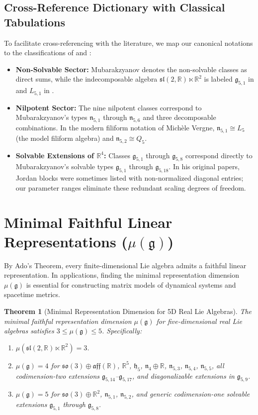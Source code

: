 \documentclass[11pt,a4paper]{article}
\newtheorem{theorem}{Theorem}[section]
\theoremstyle{definition}
\theoremstyle{remark}
\newcommand{\R}{\mathbb{R}}
\newcommand{\g}{\mathfrak{g}}
\newcommand{\hh}{\mathfrak{h}}
\begin{document}
\subsection{Cross-Reference Dictionary with Classical Tabulations}
To facilitate cross-referencing with the literature, we map our canonical notations to the classifications of \citet{Mubarakzyanov1966} and \citet{SnoblWinternitz}:
\begin{itemize}
    \item \textbf{Non-Solvable Sector:} Mubarakzyanov denotes the non-solvable classes as direct sums, while the indecomposable algebra $\mathfrak{sl}(2,\R) \ltimes \R^2$ is labeled $\mathfrak{g}_{5,1}$ in \citet{Turkowski1988} and $L_{5,1}$ in \citet[\S~4.2]{SnoblWinternitz}.
    \item \textbf{Nilpotent Sector:} The nine nilpotent classes correspond to Mubarakzyanov's types $\mathfrak{n}_{5,1}$ through $\mathfrak{n}_{5,6}$ and three decomposable combinations. In the modern filiform notation of Mich\`ele Vergne, $\mathfrak{n}_{5,1} \cong L_5$ (the model filiform algebra) and $\mathfrak{n}_{5,2} \cong Q_5$.
    \item \textbf{Solvable Extensions of $\R^4$:} Classes $\g_{5,1}$ through $\g_{5,8}$ correspond directly to Mubarakzyanov's solvable types $\mathfrak{g}_{5,1}$ through $\mathfrak{g}_{5,18}$. In his original papers, Jordan blocks were sometimes listed with non-normalized diagonal entries; our parameter ranges eliminate these redundant scaling degrees of freedom.
\end{itemize}

\section{Minimal Faithful Linear Representations ($\mu(\g)$)}\label{sec:representations}

By Ado's Theorem, every finite-dimensional Lie algebra admits a faithful linear representation. In applications, finding the minimal representation dimension $\mu(\g)$ is essential for constructing matrix models of dynamical systems and spacetime metrics.

\begin{theorem}[Minimal Representation Dimension for 5D Real Lie Algebras]\label{thm:mu_dim}
The minimal faithful representation dimension $\mu(\g)$ for five-dimensional real Lie algebras satisfies $3 \le \mu(\g) \le 5$. Specifically:
\begin{enumerate}
    \item $\mu(\mathfrak{sl}(2,\R) \ltimes \R^2) = 3$.
    \item $\mu(\g) = 4$ for $\mathfrak{so}(3) \oplus \mathfrak{aff}(\R)$, $\R^5$, $\hh_5$, $\mathfrak{n}_4 \oplus \R$, $\mathfrak{n}_{5,3}$, $\mathfrak{n}_{5,4}$, $\mathfrak{n}_{5,5}$, all codimension-two extensions $\g_{5,14}$--$\g_{5,17}$, and diagonalizable extensions in $\g_{5,9}$.
    \item $\mu(\g) = 5$ for $\mathfrak{so}(3) \oplus \R^2$, $\mathfrak{n}_{5,1}$, $\mathfrak{n}_{5,2}$, and generic codimension-one solvable extensions $\g_{5,1}$ through $\g_{5,8}$.
\end{enumerate}
\end{theorem}
\end{document}
